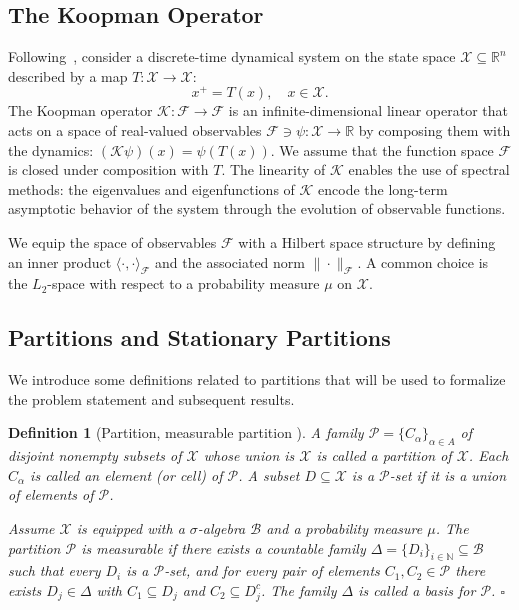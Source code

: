 \documentclass[letterpaper, 10 pt, conference]{ieeeconf}
\newcommand{\naturals}{\mathbb{N}}
\newcommand{\Bc}{\mathcal{B}}
\newcommand{\Pc}{\mathcal{P}}
\newcommand{\Xc}{\mathcal{X}}
\newcommand{\oprocendsymbol}{\hbox{$\square$}}
\newcommand{\oprocend}{\relax\ifmmode\else\unskip\hfill\fi\oprocendsymbol}
\newtheorem{definition}[theorem]{Definition}
\begin{document}
\subsection{The Koopman Operator}
Following~\cite{AM-YS-IM:20}, consider a discrete-time dynamical
system on the state space $\mathcal{X} \subseteq \mathbb{R}^n$
described by a map $T: \mathcal{X} \to \mathcal{X}$:
\begin{equation}\label{eqn:sys_dynamics}
  x^+ = T(x), \quad x \in \mathcal{X}.
\end{equation}
The Koopman operator $\mathcal{K}: \mathcal{F} \to \mathcal{F}$ is an
infinite-dimensional linear operator that acts on a space of
real-valued observables
$\mathcal{F} \ni \psi: \mathcal{X} \to \mathbb{R}$ by composing them
with the dynamics: $(\mathcal{K}\psi)(x) = \psi(T(x))$. We assume that the function space $\mathcal{F}$ is closed under composition with $T$. The linearity of $\mathcal{K}$ enables the use of spectral methods: the eigenvalues and eigenfunctions of $\mathcal{K}$ encode the long-term asymptotic behavior of the system through the evolution of observable
functions. 

We equip the space of observables
$\mathcal{F}$ with a Hilbert space structure by defining an inner
product $\langle \cdot, \cdot \rangle_{\mathcal{F}}$ and the
associated norm $\|\cdot\|_{\mathcal{F}}$. A common choice is the
$L_2$-space with respect to a probability measure $\mu$ on
$\mathcal{X}$. 


\subsection{Partitions and Stationary Partitions}

We introduce some definitions related to partitions that will be used to formalize the problem statement and subsequent results.

\begin{definition}[Partition, measurable partition \cite{IM-SW:99}]\label{def:partition}
A family $\Pc=\{C_\alpha\}_{\alpha\in A}$ of disjoint nonempty subsets of $\Xc$ whose union is $\Xc$ is called a \emph{partition} of $\Xc$. Each $C_\alpha$ is called an \emph{element} (or \emph{cell}) of $\Pc$. A subset $D\subseteq\Xc$ is a \emph{$\Pc$-set} if it is a union of elements of $\Pc$.

Assume $\Xc$ is equipped with a $\sigma$-algebra $\Bc$ and a probability measure $\mu$. The partition $\Pc$ is \emph{measurable} if there exists a countable family $\Delta=\{D_i\}_{i\in\naturals}\subseteq\Bc$ such that every $D_i$ is a $\Pc$-set, and for every pair of elements $C_1,C_2\in\Pc$ there exists $D_j\in\Delta$ with $C_1\subseteq D_j$ and $C_2\subseteq D_j^c$. The family $\Delta$ is called a \emph{basis} for $\Pc$.
\oprocend
\end{definition}
\end{document}
